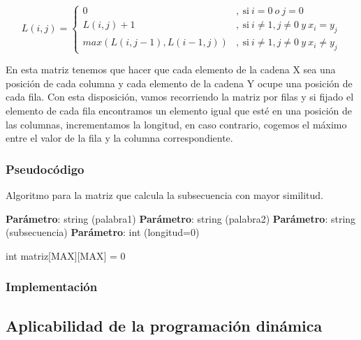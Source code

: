 \[
  L(i,j) = 
  \left \{
    \begin{aligned}
      0 &,\ \text{si} \ i = 0 \ o \ j = 0\\
      L(i,j) + 1 &,\ \text{si} \ i \neq  1 , j \neq  0 \ y \ x_i = y_j\\
      max(L(i,j-1) , L(i-1,j))&,\ \text{si} \ i \neq 1 , j \neq 0 \ y \ x_i \neq y_j
    \end{aligned}
  \right .
\]

En esta matriz tenemos que hacer que cada elemento de la cadena X sea una posición de cada columna 
y cada elemento de la cadena Y ocupe una posición de cada fila. Con esta disposición, vamos recorriendo
la matriz por filas y si fijado el elemento de cada fila encontramos un elemento igual que esté en una 
posición de las columnas, incrementamos la longitud, en caso contrario, cogemos el máximo entre el valor de 
la fila y la columna correspondiente.

\subsubsection{Pseudocódigo}

\begin{algorithm}[H]
  \caption{Algoritmo para la matriz que calcula la subsecuencia con mayor similitud.}\label{alg:simil}
  \begin{minipage}{0.92\textwidth}
  \textbf{Parámetro}: string (palabra1)
  \textbf{Parámetro}: string (palabra2)
  \textbf{Parámetro}: string (subsecuencia)
  \textbf{Parámetro}: int (longitud=0)
  \end{minipage}

  int matriz[MAX][MAX] = {0}

   {
     {
    }
  }
\end{algorithm}

\subsubsection{Implementación}


\subsection{Aplicabilidad de la programación dinámica}

